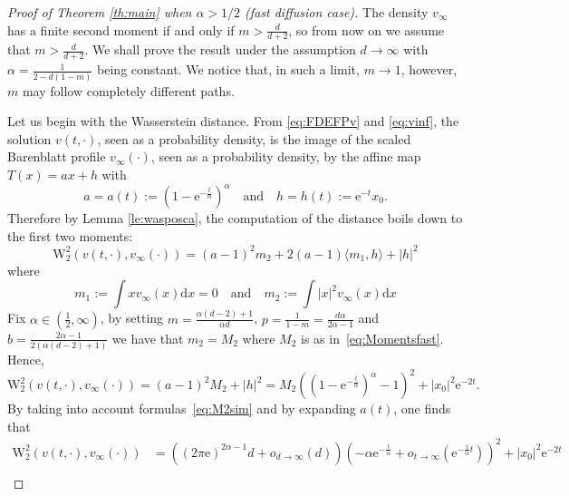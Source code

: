 \documentclass[10pt,reqno]{amsart}
\numberwithin{equation}{section}
\begin{document}
\begin{proof}[Proof of Theorem \ref{th:main} when $\alpha>1/2$ (fast diffusion case)]

The density $v_\infty$ has a finite second moment if and only if $m>\frac{d}{d+2}$, so from now on we assume that $m>\frac{d}{d+2}$. We shall prove the result under the assumption $d\rightarrow\infty$ with $\alpha=\frac{1}{2-d(1-m)}$ being constant. We notice that, in such a limit, $m\rightarrow1$, however, $m$ may follow completely different paths.

Let us begin with the Wasserstein distance.
From \eqref{eq:FDEFPv} and \eqref{eq:vinf}, the solution $v(t,\cdot)$, seen as a probability density, is the image of the scaled Barenblatt profile $v_\infty(\cdot)$, seen as a probability density, by the affine map $T(x)=ax+h$ with 
\begin{equation}
    a=a(t):=(1-\mathrm{e}^{-\frac{t}{\alpha}})^\alpha
    \quad\text{and}\quad 
    h=h(t):=\mathrm{e}^{-t}x_0.
\end{equation}
Therefore by Lemma \ref{le:wasposca}, the computation of the distance boils down to the first two moments: 
\begin{equation}
    \mathrm{W}_2^2(v(t,\cdot),v_\infty(\cdot))
    =(a-1)^2m_2+2(a-1)\langle m_1,h\rangle+|h|^2
\end{equation}
where
\begin{equation}
    m_1:=\int xv_\infty(x)\mathrm{d}x  =0\quad\mbox{and}\quad m_2:=\int|x|^2v_\infty(x)\mathrm{d}x
\end{equation}
Fix $\alpha \in\left(\frac{1}{2}, \infty\right)$, by setting $m=\frac{\alpha(d-2)+1}{\alpha d}$, $p=\frac{1}{1-m}=\frac{d\alpha}{2\alpha - 1}$ and $b=\frac{2\alpha-1}{2(\alpha(d-2)+1)}$ we have that $m_2=M_2$ where $M_2$ is as in~\eqref{eq:Momentsfast}. 
Hence,
\begin{equation} \label{eq:w2_exact_m>1}
    \mathrm{W}_2^2(v(t,\cdot),v_\infty(\cdot))
    =(a-1)^2M_2+|h|^2
    =M_2((1-\mathrm{e}^{-\frac{t}{\alpha}})^\alpha-1)^2+|x_0|^2\mathrm{e}^{-2t}.
\end{equation}
By taking into account formulas~\eqref{eq:M2sim} and by expanding $a(t)$, one finds that
\begin{equation}\label{final-inequality-w2}
    \begin{split}
\mathrm{W}_2^2(v(t,\cdot),v_\infty(\cdot)) &= \left((2\pi\mathrm{e})^{2\alpha-1}d+o_{d\rightarrow\infty}(d)\right)\left(-\alpha \mathrm{e}^{-\frac{t}{\alpha}}+o_{t\rightarrow\infty}(\mathrm{e}^{-\frac{1}{\alpha}t})\right)^2 + |x_0|^2\mathrm{e}^{-2t} \\

\end{split}
\end{equation}
\end{proof}
\end{document}
